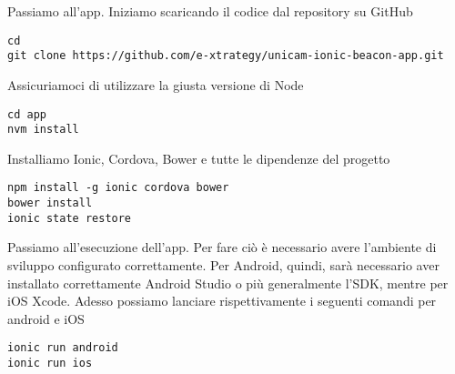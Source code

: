 Passiamo all'app.
Iniziamo scaricando il codice dal repository su GitHub
\begin{lstlisting}[style=JavaScriptCode]
cd
git clone https://github.com/e-xtrategy/unicam-ionic-beacon-app.git
\end{lstlisting}
Assicuriamoci di utilizzare la giusta versione di Node
\begin{lstlisting}[style=JavaScriptCode]
cd app
nvm install
\end{lstlisting} 
Installiamo Ionic, Cordova, Bower e tutte le dipendenze del progetto
\begin{lstlisting}[style=JavaScriptCode]
npm install -g ionic cordova bower
bower install
ionic state restore
\end{lstlisting}
Passiamo all'esecuzione dell'app.
Per fare ciò è necessario avere l'ambiente di sviluppo configurato correttamente. 
Per Android, quindi, sarà necessario aver installato correttamente Android Studio o più generalmente l'SDK, mentre per iOS Xcode.
Adesso possiamo lanciare rispettivamente i seguenti comandi per android e iOS
\begin{lstlisting}[style=JavaScriptCode]
ionic run android
ionic run ios
\end{lstlisting}  

